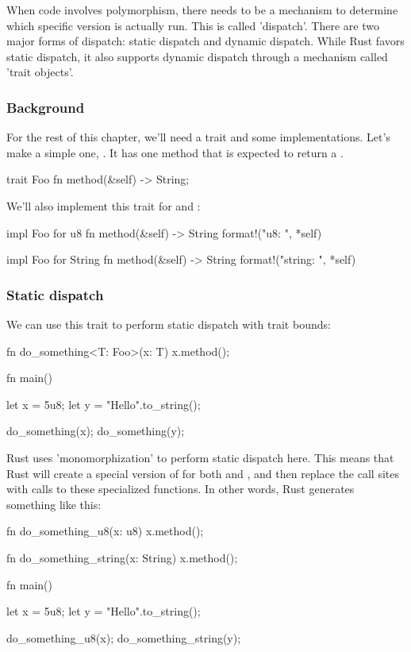 When code involves polymorphism, there needs to be a mechanism to determine which specific version is actually run. This is called 
'dispatch'. There are two major forms of dispatch: static dispatch and dynamic dispatch. While Rust favors static dispatch, it also 
supports dynamic dispatch through a mechanism called 'trait objects'.

\subsubsection*{Background}

For the rest of this chapter, we'll need a trait and some implementations. Let's make a simple one, . It has one method that 
is expected to return a \String.

\begin{rustc}
trait Foo {
    fn method(&self) -> String;
}
\end{rustc}

We'll also implement this trait for  and \String:

\begin{rustc}
impl Foo for u8 {
    fn method(&self) -> String { format!("u8: {}", *self) }
}

impl Foo for String {
    fn method(&self) -> String { format!("string: {}", *self) }
}
\end{rustc}

\subsubsection*{Static dispatch}

We can use this trait to perform static dispatch with trait bounds:

\begin{rustc}
fn do_something<T: Foo>(x: T) {
    x.method();
}

fn main() {
    let x = 5u8;
    let y = "Hello".to_string();

    do_something(x);
    do_something(y);
}
\end{rustc}

Rust uses 'monomorphization' to perform static dispatch here. This means that Rust will create a special version of  for 
both  and \String, and then replace the call sites with calls to these specialized functions. In other words, Rust generates something 
like this:

\begin{rustc}
fn do_something_u8(x: u8) {
    x.method();
}

fn do_something_string(x: String) {
    x.method();
}

fn main() {
    let x = 5u8;
    let y = "Hello".to_string();

    do_something_u8(x);
    do_something_string(y);
}
\end{rustc}

